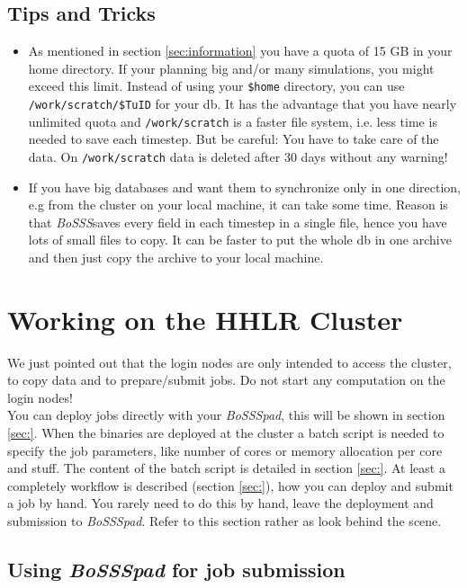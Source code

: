 \documentclass[11pt,twoside,a4paper]{fdyartcl}
\newcommand{\Bosss}{\textit{BoSSS}}
\begin{document}
\subsection{Tips and Tricks}
\label{sec:tips}
\begin{itemize}
\item As mentioned in section \ref{sec:information} you have a quota of 15 GB in your home directory. If your planning big and/or many simulations, you might exceed this limit. Instead of using your \verb|$home| directory, you can use \verb|/work/scratch/$TuID| for your db. It has the advantage that you have nearly unlimited quota and \verb|/work/scratch| is a faster file system, i.e. less time is needed to save each timestep. But be careful: You have to take care of the data. On \verb|/work/scratch| data is deleted after 30 days without any warning!
\item If you have big databases and want them to synchronize only in one direction, e.g from the cluster on your local machine, it can take some time. Reason is that \Bosss saves every field in each timestep in a single file, hence you have lots of small files to copy. It can be faster to put the whole db in one archive and then just copy the archive to your local machine.
\end{itemize}


\section{Working on the HHLR Cluster}
\label{sec:WorkingHHLR}
We just pointed out that the login nodes are only intended to access the cluster, to copy data and to prepare/submit jobs. Do not start any computation on the login nodes! \\
You can deploy jobs directly with your \emph{BoSSSpad}, this will be shown in section \ref{sec:}.
When the binaries are deployed at the cluster a batch script is needed to specify the job parameters, like number of cores or memory allocation per core and stuff. The content of the batch script is detailed in section \ref{sec:}.
At least a completely workflow is described (section \ref{sec:}), how you can deploy and submit a job by hand. You rarely need to do this by hand, leave the deployment and submission to \emph{BoSSSpad}. Refer to this section rather as look behind the scene.

\subsection{Using \emph{BoSSSpad} for job submission}
\label{sec:BoSSSpad}
\end{document}

